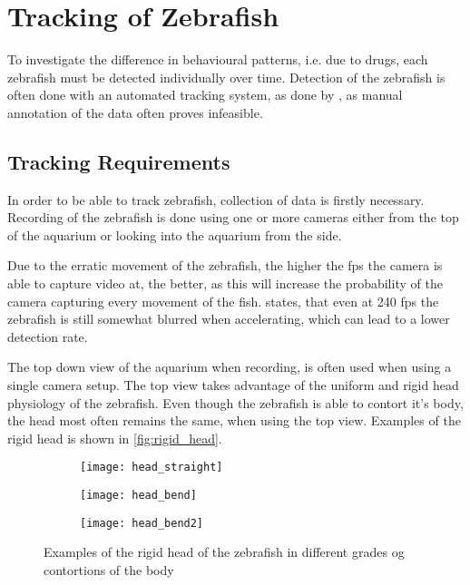 \section{Tracking of Zebrafish}

To investigate the difference in behavioural patterns, i.e. due to drugs, each zebrafish must be detected individually over time. Detection of the zebrafish is often done with an automated tracking system, as done by \cite{Stewart2015}, as manual annotation of the data often proves infeasible.

\subsection{Tracking Requirements}
In order to be able to track zebrafish, collection of data is firstly necessary. Recording of the zebrafish is done using one or more cameras either from the top of the aquarium or looking into the aquarium from the side.

Due to the erratic movement of the zebrafish, the higher the \gls{fps} the camera is able to capture video at, the better, as this will increase the probability of the camera capturing every movement of the fish. \cite{Pedersen2017} states, that even at 240 \gls{fps} the zebrafish is still somewhat blurred when accelerating, which can lead to a lower detection rate.

The top down view of the aquarium when recording, is often used when using a single camera setup. The top view takes advantage of the uniform and rigid head physiology of the zebrafish. Even though the zebrafish is able to contort it's body, the head most often remains the same, when using the top view. Examples of the rigid head is shown in \autoref{fig:rigid_head}.

\begin{figure}[H]
	\centering
	\begin{subfigure}[b]{0.3\textwidth}
		\texttt{[image: head\_straight]}
		\label{fig:head_straight}
	\end{subfigure}
	\begin{subfigure}[b]{0.3\textwidth}
		\texttt{[image: head\_bend]}
		\label{fig:head_bend}
	\end{subfigure}
	\begin{subfigure}[b]{0.3\textwidth}
		\texttt{[image: head\_bend2]}
		\label{fig:head_bend2}
	\end{subfigure}
	\caption{Examples of the rigid head of the zebrafish in different grades og contortions of the body}
	\label{fig:rigid_head}
\end{figure}

